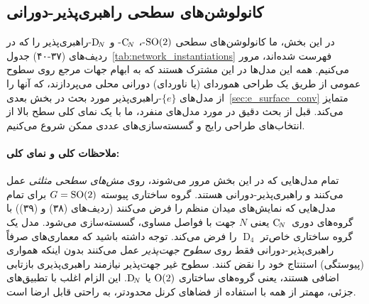 

\subsection{کانولوشن‌های سطحی راهبری‌پذیر-دورانی}
\label{sec:so2_surface_conv}

در این بخش، ما کانولوشن‌های سطحی $\operatorname{SO}(2)$-، $\operatorname{C}_{\!N}$- و $\operatorname{D}_{\!N}$-راهبری‌پذیر را که در ردیف‌های (۳۷-۴۰) جدول~\ref{tab:network_instantiations} فهرست شده‌اند، مرور می‌کنیم.
همه این مدل‌ها در این مشترک هستند که به ابهام جهات مرجع روی سطوح عمومی از طریق یک طراحی هموردای (یا ناوردای) دورانی محلی می‌پردازند، که آنها را از مدل‌های $\{e\}$-راهبری‌پذیر مورد بحث در بخش بعدی~\ref{sec:e_surface_conv} متمایز می‌کند.
قبل از بحث دقیق در مورد مدل‌های منفرد، ما با یک نمای کلی سطح بالا از انتخاب‌های طراحی رایج و گسسته‌سازی‌های عددی ممکن شروع می‌کنیم.


\paragraph{ملاحظات کلی و نمای کلی:}
تمام مدل‌هایی که در این بخش مرور می‌شوند، روی \emph{مش‌های سطحی مثلثی} عمل می‌کنند و راهبری‌پذیر-دورانی هستند.
گروه ساختاری پیوسته $G=\operatorname{SO}(2)$ برای تمام مدل‌هایی که نمایش‌های میدان منظم را فرض می‌کنند (ردیف‌های (۳۸) و (۳۹)) با گروه‌های دوری~$\operatorname{C}_{\!N}$ یعنی $N$ جهت با فواصل مساوی، گسسته‌سازی می‌شود.
مدل \citet{huang2019texturenet} یک گروه ساختاری خاص‌تر $\operatorname{D}_4$ را فرض می‌کند.
توجه داشته باشید که معماری‌های صرفاً راهبری‌پذیر-دورانی فقط روی \emph{سطوح جهت‌پذیر} عمل می‌کنند بدون اینکه همواری (پیوستگی) استنتاج خود را نقض کنند.
سطوح غیر جهت‌پذیر نیازمند راهبری‌پذیری بازتابی اضافی هستند، یعنی گروه‌های ساختاری $\operatorname{O}(2)$ یا $\operatorname{D}_{\!N}$.
این الزام اغلب با تطبیق‌های جزئی، مهمتر از همه با استفاده از فضاهای کرنل محدودتر، به راحتی قابل ارضا است.


